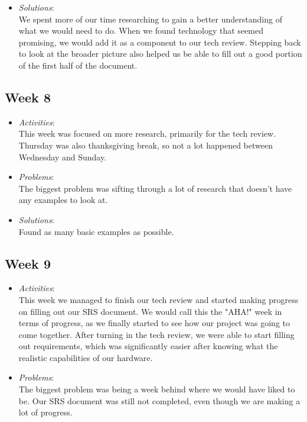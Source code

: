 \documentclass[compsoc,draftclsnofoot,onecolumn,10pt]{IEEEtran}
\begin{document}
\begin{itemize}
\begin{itemize}
        \item \textit{Solutions}:\\
        We spent more of our time researching to gain a better understanding of what we would need to do. 
        When we found technology that seemed promising, we would add it as a component to our tech review.
        Stepping back to look at the broader picture also helped us be able to fill out a good portion of the first half of the document.
	\end{itemize}
   
\subsection{Week 8}
	\begin{itemize}
        \item \textit{Activities}:\\
        This week was focused on more research, primarily for the tech review. 
        Thursday was also thanksgiving break, so not a lot happened between Wednesday and Sunday. 
        \item \textit{Problems}:\\
        The biggest problem was sifting through a lot of research that doesn't have any examples to look at. 
        \item \textit{Solutions}:\\
        Found as many basic examples as possible.
	\end{itemize}
   
\subsection{Week 9}
	\begin{itemize}
        \item \textit{Activities}:\\
        This week we managed to finish our tech review and started making progress on filling out our SRS document.
        We would call this the "AHA!" week in terms of progress, as we finally started to see how our project was going to come together. 
        After turning in the tech review, we were able to start filling out requirements, which was significantly easier after knowing what the realistic capabilities of our hardware. 
        
        \item \textit{Problems}:\\
        The biggest problem was being a week behind where we would have liked to be. 
        Our SRS document was still not completed, even though we are making a lot of progress. 
       

\end{itemize}
\end{itemize}
\end{document}
